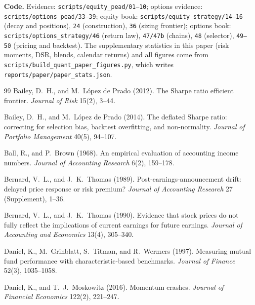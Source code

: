 \documentclass[11pt]{article}
\theoremstyle{definition}
\newcommand{\1}{\mathbf{1}}
\begin{document}
\noindent\textbf{Code.} Evidence: \texttt{scripts/equity\_pead/01--10};
options evidence: \texttt{scripts/options\_pead/33--39}; equity book:
\texttt{scripts/equity\_strategy/14--16} (decay and positions), \texttt{24} (construction),
\texttt{36} (sizing frontier); options book: \texttt{scripts/options\_strategy/46}
(return law), \texttt{47/47b} (chains), \texttt{48} (selector), \texttt{49--50} (pricing and
backtest). The supplementary statistics in this paper (risk moments, DSR, blends, calendar
returns) and all figures come from \texttt{scripts/build\_quant\_paper\_figures.py}, which
writes \texttt{reports/paper/paper\_stats.json}.

\begin{thebibliography}{99}\small
Bailey, D.~H., and M.~L\'opez de Prado (2012). The Sharpe ratio efficient frontier.
\textit{Journal of Risk} 15(2), 3--44.

Bailey, D.~H., and M.~L\'opez de Prado (2014). The deflated Sharpe ratio: correcting for
selection bias, backtest overfitting, and non-normality. \textit{Journal of Portfolio
Management} 40(5), 94--107.

Ball, R., and P.~Brown (1968). An empirical evaluation of accounting income numbers.
\textit{Journal of Accounting Research} 6(2), 159--178.

Bernard, V.~L., and J.~K.~Thomas (1989). Post-earnings-announcement drift: delayed price
response or risk premium? \textit{Journal of Accounting Research} 27 (Supplement), 1--36.

Bernard, V.~L., and J.~K.~Thomas (1990). Evidence that stock prices do not fully reflect
the implications of current earnings for future earnings. \textit{Journal of Accounting and
Economics} 13(4), 305--340.

Daniel, K., M.~Grinblatt, S.~Titman, and R.~Wermers (1997). Measuring mutual fund
performance with characteristic-based benchmarks. \textit{Journal of Finance} 52(3),
1035--1058.

Daniel, K., and T.~J.~Moskowitz (2016). Momentum crashes. \textit{Journal of Financial
Economics} 122(2), 221--247.


\end{thebibliography}
\end{document}
